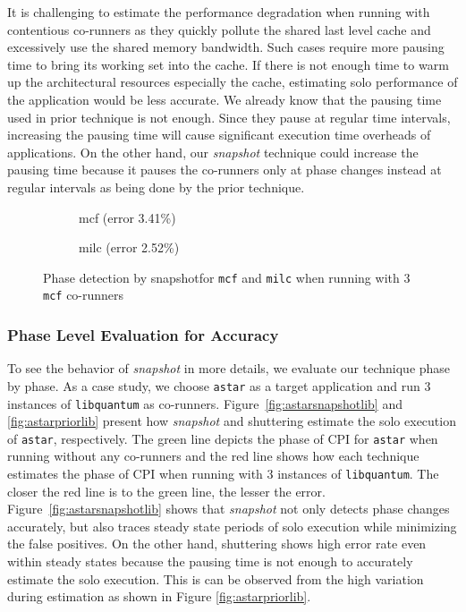 \documentclass{sig-alternate}
\begin{document}
It is challenging to estimate the performance degradation when running with contentious co-runners as they quickly pollute the shared last level cache and excessively use the shared memory bandwidth. Such cases require more pausing time to bring its working set into the cache. If there is not enough time to warm up the architectural resources especially the cache, estimating solo performance of the application would be less accurate. We already know that the pausing time used in prior technique is not enough. Since they pause at regular time intervals, increasing the pausing time will cause significant execution time overheads of applications. On the other hand, our \textit{snapshot} technique could increase the pausing time because it pauses the co-runners only at phase changes instead  at regular intervals as being done by the prior technique.
\begin{figure*}
\centering
\begin{subfigure}[t]{1\columnwidth}
\centering
{}
\caption{mcf (error 3.41\%)}
\label{fig:mcfsnapshotmcf}
\end{subfigure}
\hfill
\begin{subfigure}[t]{1\columnwidth}
\centering
{}
\caption{milc (error 2.52\%)}
\label{fig:milcsnapshotmcf}
\end{subfigure}
\caption{Phase detection by snapshotfor \texttt{mcf} and \texttt{milc} when running with 3 \texttt{mcf} co-runners\vspace{-0.1in}}
\label{fig:milcphase}
\end{figure*}
\subsubsection{Phase Level Evaluation for Accuracy}
\label{subsubsec:PhaseLevelEvaluationforAccuracy}

To see the behavior of \textit{snapshot} in more details, we evaluate our technique phase by phase. As a case study, we choose \texttt{astar} as a target application and run 3 instances of \texttt{libquantum} as co-runners. Figure~\ref{fig:astarsnapshotlib} and \ref{fig:astarpriorlib} present how \textit{snapshot} and shuttering estimate the solo execution of \texttt{astar}, respectively. The green line depicts the phase of CPI for \texttt{astar} when running without any co-runners and the red line shows how each technique estimates the phase of CPI when running with 3 instances of \texttt{libquantum}. The closer the red line is to the green line, the lesser the error. Figure~\ref{fig:astarsnapshotlib} shows that \textit{snapshot} not only detects phase changes accurately, but also traces steady state periods of solo execution while minimizing the false positives. On the other hand,  shuttering shows high error rate even within steady states because the pausing time is not enough to accurately estimate the solo execution. This is can be observed from the high variation during estimation as shown in Figure \ref{fig:astarpriorlib}.
\end{document}
